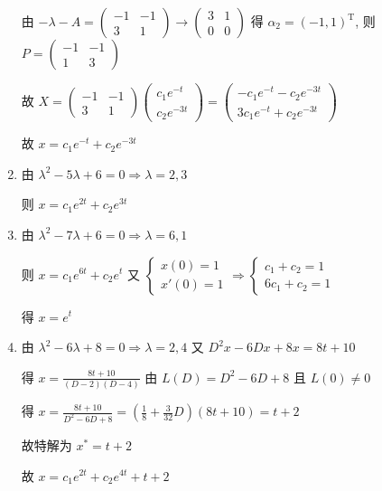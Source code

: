 \begin{enumerate}
			       由 \( -\lambda-A = \begin{pmatrix}
				       -1 & -1 \\
				       3  & 1
			       \end{pmatrix} \rightarrow \begin{pmatrix}
				       3 & 1 \\
				       0 & 0
			       \end{pmatrix} \) 得 \( \alpha_{2} = (-1, 1)^{\mathrm{T}} \), 则 \( P = \begin{pmatrix}
				       -1 & -1 \\
				       1  & 3
			       \end{pmatrix} \)

			       故 \( X = \begin{pmatrix}
				       -1 & -1 \\
				       3  & 1
			       \end{pmatrix}\begin{pmatrix}
				       c_{1}e^{-t} \\
				       c_{2}e^{-3t}
			       \end{pmatrix} = \begin{pmatrix}
				       -c_{1}e^{-t} - c_{2}e^{-3t} \\
				       3c_{1}e^{-t} + c_{2}e^{-3t}
			       \end{pmatrix} \)

			       故 \( x = c_{1}e^{-t} + c_{2}e^{-3t} \)
			 \item %
			       由 \( \lambda^{2} - 5\lambda + 6 = 0 \Rightarrow \lambda = 2, 3 \)

			       则 \( x = c_{1}e^{2t} + c_{2}e^{3t} \)
			 \item %
			       由 \( \lambda^{2} - 7\lambda + 6 = 0 \Rightarrow \lambda = 6, 1 \)

			       则 \( x = c_{1}e^{6t} + c_{2}e^{t} \) 又 \( \begin{cases}
				       x(0) = 1 \\
				       x'(0) = 1
			       \end{cases} \Rightarrow \begin{cases}
				       c_{1} + c_{2} = 1 \\
				       6c_{1} + c_{2} = 1
			       \end{cases} \)

			       得 \( x = e^{t} \)
			 \item %
			       由 \( \lambda^{2} - 6\lambda + 8 = 0 \Rightarrow \lambda = 2, 4 \) 又 \( D^{2}x - 6Dx + 8x = 8t + 10 \)

			       得 \( x = \frac{8t+10}{(D-2)(D-4)} \) 由 \( L(D) = D^{2}-6D+8 \) 且 \( L(0) \neq 0 \)

			       得 \( x = \frac{8t+10}{D^{2}-6D+8} = \left( \frac{1}{8} + \frac{3}{32}D \right)(8t+10) = t + 2 \)

			       故特解为 \( x^{*} = t + 2 \)

			       故 \( x = c_{1}e^{2t} + c_{2}e^{4t} + t + 2 \)
		 \end{enumerate}


